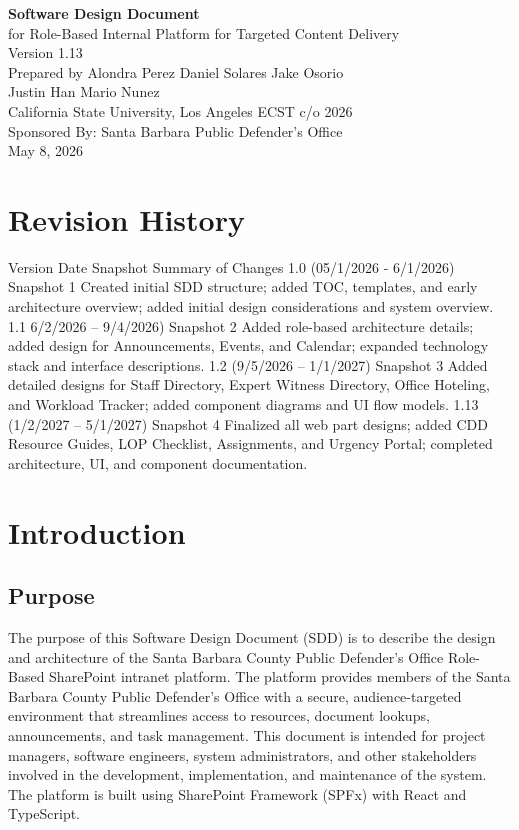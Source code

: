 \documentclass[12pt]{article}
\begin{document}
\begin{titlepage}
\centering
\vspace*{1in}
{\LARGE\bfseries Software Design Document\\[0.25in]}
{\large for Role-Based Internal Platform for Targeted Content Delivery\\[0.4in]}
Version 1.13\\
Prepared by Alondra Perez
Daniel Solares
Jake Osorio\\
Justin Han
Mario Nunez\\
California State University, Los Angeles ECST c/o 2026\\
Sponsored By: Santa Barbara Public Defender's Office\\
May 8, 2026\\
\vfill
\end{titlepage}

\tableofcontents
\clearpage
\section*{Revision History}

Version Date Snapshot Summary of Changes 1.0 (05/1/2026 - 6/1/2026) Snapshot 1 Created initial SDD structure; added TOC, templates, and early architecture overview; added initial design considerations and system overview. 1.1 6/2/2026 -- 9/4/2026) Snapshot 2 Added role-based architecture details; added design for Announcements, Events, and Calendar; expanded technology stack and interface descriptions. 1.2 (9/5/2026 -- 1/1/2027) Snapshot 3 Added detailed designs for Staff Directory, Expert Witness Directory, Office Hoteling, and Workload Tracker; added component diagrams and UI flow models. 1.13 (1/2/2027 -- 5/1/2027) Snapshot 4 Finalized all web part designs; added CDD Resource Guides, LOP Checklist, Assignments, and Urgency Portal; completed architecture, UI, and component documentation.

\section{Introduction}

\subsection{Purpose}

The purpose of this Software Design Document (SDD) is to describe the design and architecture of the Santa Barbara County Public Defender's Office Role-Based SharePoint intranet platform. The platform provides members of the Santa Barbara County Public Defender's Office with a secure, audience-targeted environment that streamlines access to resources, document lookups, announcements, and task management. This document is intended for project managers, software engineers, system administrators, and other stakeholders involved in the development, implementation, and maintenance of the system. The platform is built using SharePoint Framework (SPFx) with React and TypeScript.
\end{document}

